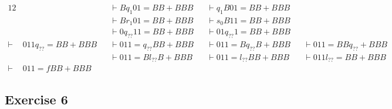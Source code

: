 \documentclass[docid=TP11]{tcom_TP}
\begin{document}
{\begin{alignat*}{12}
		   &                    &&\vdash B q_{1 } 01=BB+BBB &&\vdash q_{1 } B01=BB+BBB  &&\\
		   &                    &&\vdash B r_{1 } 01=BB+BBB &&\vdash s_0 B11=BB+BBB     &&\\
		   &                    &&\vdash 0 q_{??} 11=BB+BBB &&\vdash 01 q_{??} 1=BB+BBB &&\\
	\vdash & 011 q_{??} =BB+BBB &&\vdash 011= q_{??} BB+BBB &&\vdash 011=B q_{??} B+BBB &&\vdash 011=BB q_{??} +BBB &&\\
		   &                    &&\vdash 011=B l_{??} B+BBB &&\vdash 011= l_{??} BB+BBB &&\vdash 011 l_{??} =BB+BBB &&\\
	\vdash & 011= f BB+BBB      && 
\end{alignat*}
\subsection{Exercise 6}
}
\end{document}
